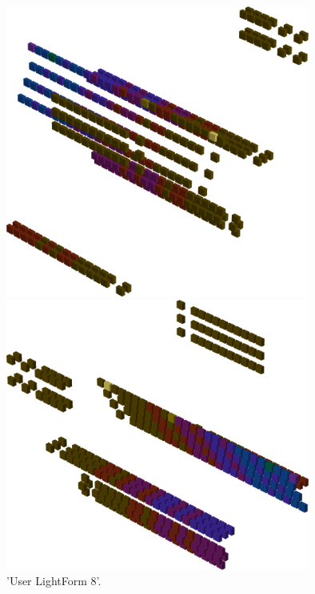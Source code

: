 \begin{minipage}[b]{0.48\linewidth}
\vspace{1cm}
\begin{figure}[H]
    \centering
    \begin{adjustbox}{width=5cm,margin=0cm 0cm}
      \includegraphics[width=10cm]{src/colorspace_patterns/pattern16-45.png}%
    \end{adjustbox}
    \begin{adjustbox}{width=5cm,margin=0cm 0cm}
      \includegraphics[width=10cm]{src/colorspace_patterns/pattern16-225.png}%
    \end{adjustbox}
\caption{'User LightForm 8'.}
\end{figure}
\end{minipage}
